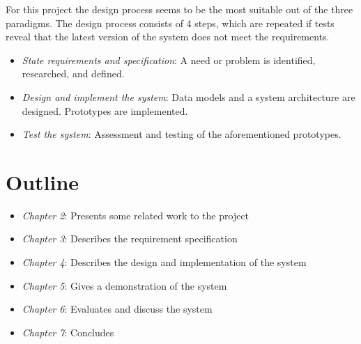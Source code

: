 For this project the design process seems to be the most suitable out of the three paradigms. The design process consists of 4 steps, which are repeated if tests reveal that the latest version of the system does not meet the requirements.

\begin{itemize}
\item \emph{State requirements and specification}: A need or problem is identified, researched, and defined.
\item \emph{Design and implement the system}: Data models and a system architecture are designed. Prototypes are implemented.
\item \emph{Test the system}: Assessment and testing of the aforementioned prototypes.
\end{itemize}

\section{Outline}

\begin{itemize}
\item \emph{Chapter 2}: Presents some related work to the project
\item \emph{Chapter 3}: Describes the requirement specification
\item \emph{Chapter 4}: Describes the design and implementation of the system
\item \emph{Chapter 5}: Gives a demonstration of the system
\item \emph{Chapter 6}: Evaluates and discuss the system
\item \emph{Chapter 7}: Concludes
\end{itemize}





